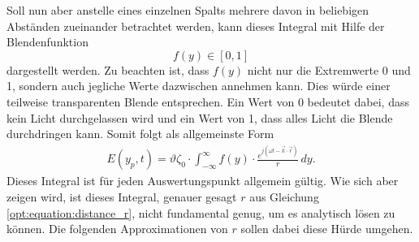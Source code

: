 Soll nun aber anstelle eines einzelnen Spalts mehrere davon in beliebigen Abständen zueinander betrachtet werden, kann dieses Integral mit Hilfe der Blendenfunktion
\begin{equation*}
f(y)
\in
[0, 1]
\end{equation*}
dargestellt werden.
Zu beachten ist, dass $f(y)$ nicht nur die Extremwerte 0 und 1, sondern auch jegliche Werte dazwischen annehmen kann.
Dies würde einer teilweise transparenten Blende entsprechen.
Ein Wert von 0 bedeutet dabei, dass kein Licht durchgelassen wird und ein Wert von 1, dass alles Licht die Blende durchdringen kann.
Somit folgt als allgemeinste Form
\begin{align}
E(y_p, t)
=
\vartheta\zeta_0 \cdot \int_{-\infty}^{\infty}f(y)\cdot\frac{e^{j(\omega t - \vec{k}\cdot\vec{r})}}{r} \,dy
.
\label{opt:equation:integral_general}
\end{align}
Dieses Integral ist für jeden Auswertungspunkt allgemein gültig.
Wie sich aber zeigen wird, ist dieses Integral, genauer gesagt $r$ aus Gleichung \eqref{opt:equation:distance_r}, nicht fundamental genug, um es analytisch lösen zu können.
Die folgenden Approximationen von $r$ sollen dabei diese Hürde umgehen.


